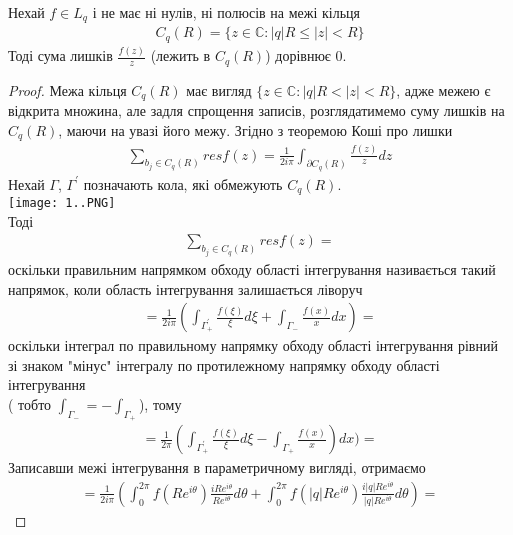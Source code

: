 \documentclass[12pt,a4paper]{article}
\begin{document}
\begin{thm}
 Нехай $f\in L_{q}$ і не має ні нулів, ні полюсів на межі кільця 
\begin{equation}\label{th21}
\begin{array}{l}
C_{q}(R)=\lbrace z\in \mathbb{C}:\left |q  \right |R\leq \left |z  \right |<R \rbrace
\end{array}
\end{equation} 
 Тоді сума лишків $\frac{f(z)}{z}$ (лежить в $C_{q}(R)$) дорівнює $0$.
\end{thm}
\begin{proof}
 Межа кільця $C_{q}(R)$ має вигляд $\lbrace z\in \mathbb{C}:\left |q  \right |R< \left |z  \right |<R \rbrace$, адже межею є відкрита множина, але задля спрощення записів, розглядатимемо суму лишків на $C_{q}(R)$, маючи на увазі його межу. Згідно з теоремою Коші про лишки
 \[\begin{array}{l}
\sum_{b_{j}\in C_{q}(R)}^{ } resf(z)= \frac{1}{2i\pi}\int_{\partial C_{q}(R)}^{ } \frac{f(z)}{z}dz
\end{array} \]
Нехай $\Gamma$, $\Gamma^{'}$ позначають кола, які обмежують $C_{q}(R)$.\\
\texttt{[image: 1..PNG]}\\
Тоді 
\[\begin{array}{l}
\sum_{b_{j} \in C_{q}(R)}^{ } resf(z) = 
\end{array} \]
оскільки правильним напрямком обходу області інтегрування називається такий
напрямок, коли область інтегрування залишається ліворуч 
\[\begin{array}{l}
= \frac{1}{2i\pi} (\int_{\Gamma^{'}_{+}}^{ }\frac{f(\xi)}{\xi}d\xi  + \int_{\Gamma_{-}}^{ }\frac{f(x)}{x}dx)=
\end{array} \]
оскільки інтеграл по правильному напрямку обходу області інтегрування рівний зі знаком "мінус" інтегралу по протилежному напрямку обходу області інтегрування\\
( тобто $\int_{\Gamma_{-}}^{ }= - \int_{\Gamma_{+}}^{ }$), тому 
\[\begin{array}{l}
=\frac{1}{2\pi}(\int_{\Gamma^{'}_{+}}^{ } \frac{f(\xi)}{\xi}d\xi - \int_{\Gamma_{+}}^{ }\frac{f(x)}{x})dx)=
\end{array} \]
 Записавши межі інтегрування в параметричному вигляді, отримаємо 
 \[\begin{array}{l}
 = \frac{1}{2i\pi}(\int_{0}^{2\pi }f(Re^{i\theta})\frac{iRe^{i\theta}}{Re^{i\theta }}d\theta  + \int_{0}^{2\pi }f(\left |q \right |Re^{i\theta })\frac{i\left |q \right |Re^{i\theta }}{\left |q \right |Re^{i\theta }}d\theta)=

\end{array}\]
\end{proof}
\end{document}
